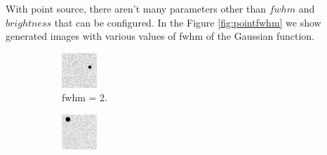 With point source, there aren't many parameters other than $fwhm$ and $brightness$ that can be configured. In the Figure \ref{fig:pointfwhm} we show generated images with various values of fwhm of the Gaussian function. 


\begin{figure}[!h]
\centering
    \begin{subfigure}{.23\textwidth}
        \centering
        \includegraphics[width=\textwidth]{images/fwhm2.png}
        \caption{fwhm = 2.}
        \label{fig:pointfwhm2}
    \end{subfigure}
    \begin{subfigure}{.23\textwidth}
        \centering
        \includegraphics[width=\textwidth]{images/fwhm3.png}

\end{subfigure}
\end{figure}
